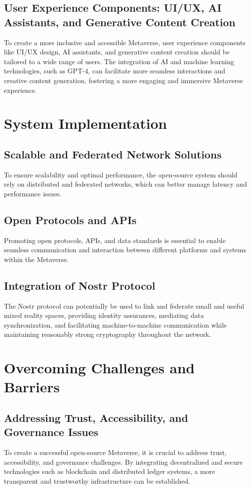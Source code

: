\subsection{User Experience Components: UI/UX, AI Assistants, and Generative Content Creation}
To create a more inclusive and accessible Metaverse, user experience components like UI/UX design, AI assistants, and generative content creation should be tailored to a wide range of users. The integration of AI and machine learning technologies, such as GPT-4, can facilitate more seamless interactions and creative content generation, fostering a more engaging and immersive Metaverse experience.

\section{System Implementation}
\subsection{Scalable and Federated Network Solutions}
To ensure scalability and optimal performance, the open-source system should rely on distributed and federated networks, which can better manage latency and performance issues.
\subsection{Open Protocols and APIs}
Promoting open protocols, APIs, and data standards is essential to enable seamless communication and interaction between different platforms and systems within the Metaverse.
\subsection{Integration of Nostr Protocol}
The Nostr protocol can potentially be used to link and federate small and useful mixed reality spaces, providing identity assurances, mediating data synchronization, and facilitating machine-to-machine communication while maintaining reasonably strong cryptography throughout the network.



\section{Overcoming Challenges and Barriers}
\subsection{Addressing Trust, Accessibility, and Governance Issues}
To create a successful open-source Metaverse, it is crucial to address trust, accessibility, and governance challenges. By integrating decentralized and secure technologies such as blockchain and distributed ledger systems, a more transparent and trustworthy infrastructure can be established.

